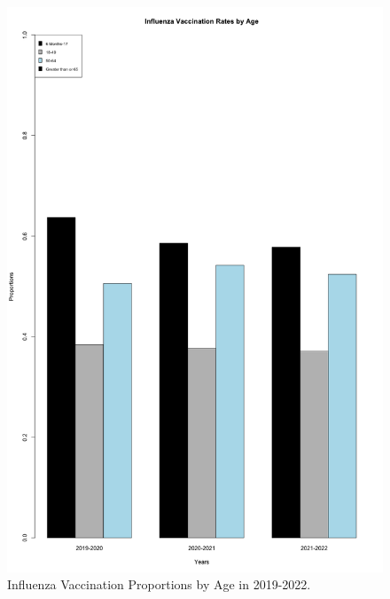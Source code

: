\documentclass[12pt]{article}
\begin{document}
\begin{figure}[ht!]
  \centering
  \includegraphics[width= 125mm ,scale=.5]{age.png}
  \caption{Influenza Vaccination Proportions by Age in 2019-2022.}
  \label{fig:age}
\end{figure}

\clearpage
\end{document}
